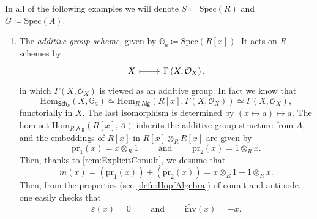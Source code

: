 \documentclass[../Main]{subfiles}
\begin{document}
\begin{ex}
	In all of the following examples we will denote $S \coloneqq \mathrm{Spec}(R)$
	and $G \coloneqq \mathrm{Spec}(A)$.\nopagebreak[4]
	\begin{enumerate}
		\item The {\em additive group scheme}, given by 
			$\mathbb{G}_a \coloneqq \mathrm{Spec}(R[x])$.
			It acts on $R$-schemes by
			\begin{equation*}
			\begin{tikzcd}[row sep = 0ex
				,/tikz/column 1/.append style={anchor=base east}
				,/tikz/column 2/.append style={anchor=base west}]
				X \arrow[r, "", mapsto] & 
				\Gamma \left( X , \mathcal{O}_{ X } \right)
			,\end{tikzcd}
			\end{equation*} 
			in which $\Gamma \left( X , \mathcal{O}_{ X } \right)$ is viewed
			as an additive group.
			In fact	we know that
			\begin{equation*}
			\mathrm{Hom}_{\mathsf{Sch}_S} \left( X, \mathbb{G}_a \right) \simeq
			\mathrm{Hom}_{R \text{-}\mathsf{Alg}} 
			\left( R[x], \Gamma \left( X , \mathcal{O}_{ X } \right) \right) \simeq
			\Gamma \left( X , \mathcal{O}_{ X } \right)
			,\end{equation*} 
			functorially in $X$.
			The last isomorphism is determined by 
			$(x \mapsto a) \mapsto a$.
			The hom set 
			$\mathrm{Hom}_{R \text{-}\mathsf{Alg}} \left( R[x], A \right)$
			inherits the additive group structure from $A$, and the embeddings
			of $R[x]$ in $R[x] \otimes_R R[x]$ are given by
			\begin{equation*}
				\widetilde{\mathrm{pr}}_1(x) = x \otimes_R 1
				\qquad \text{ and } \qquad
				\widetilde{\mathrm{pr}}_2(x) = 1 \otimes_R x
			.\end{equation*} 
			Then, thanks to \cref{rem:ExplicitComult},
			we desume that
			\begin{equation*}
				\widetilde{m}(x) =
				\left( \widetilde{\mathrm{pr}}_1(x) \right) +
				\left( \widetilde{\mathrm{pr}}_2(x) \right) =
				x \otimes_R 1 + 1 \otimes_R x
			.\end{equation*} 
			Then, from the properties (see \cref{defn:HopfAlgebra})
			of counit and antipode, one easily checks that 
			\begin{equation*}
				\widetilde{\varepsilon}(x) = 0
				\qquad \text{ and } \qquad
				\widetilde{\mathrm{inv}}(x) = -x
			.\end{equation*} 



\end{enumerate}
\end{ex}
\end{document}
